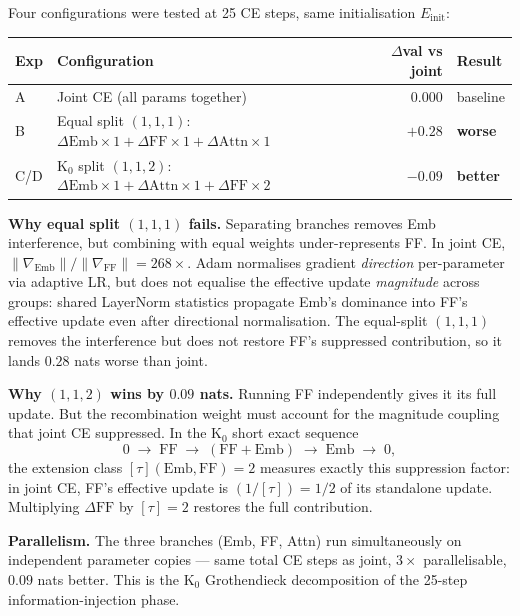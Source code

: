 \documentclass[11pt]{amsart}
\begin{document}
Four configurations were tested at 25 CE steps, same initialisation $E_\mathrm{init}$:

\begin{center}\small
\begin{tabular}{llrl}
\toprule
\textbf{Exp} & \textbf{Configuration} & \textbf{$\Delta$val vs joint} & \textbf{Result} \\
\midrule
A & Joint CE (all params together)        & $0.000$ & baseline \\
B & Equal split $(1,1,1)$: $\Delta\mathrm{Emb}{\times}1 + \Delta\mathrm{FF}{\times}1 + \Delta\mathrm{Attn}{\times}1$
  & $+0.28$ & \textbf{worse} \\
C/D & K$_0$ split $(1,1,2)$: $\Delta\mathrm{Emb}{\times}1 + \Delta\mathrm{Attn}{\times}1 + \Delta\mathrm{FF}{\times}2$
  & $-0.09$ & \textbf{better} \\
\bottomrule
\end{tabular}
\end{center}

\textbf{Why equal split $(1,1,1)$ fails.}
Separating branches removes Emb interference, but combining with equal
weights under-represents FF.
In joint CE, $\|\nabla_\mathrm{Emb}\| / \|\nabla_\mathrm{FF}\| = 268{\times}$.
Adam normalises gradient \emph{direction} per-parameter via adaptive LR,
but does not equalise the effective update \emph{magnitude} across groups:
shared LayerNorm statistics propagate Emb's dominance into FF's effective
update even after directional normalisation.
The equal-split $(1,1,1)$ removes the interference but does not restore FF's
suppressed contribution, so it lands $0.28$ nats worse than joint.

\textbf{Why $(1,1,2)$ wins by $0.09$ nats.}
Running FF independently gives it its full update.
But the recombination weight must account for the magnitude coupling
that joint CE suppressed.
In the K$_0$ short exact sequence
\[
  0 \;\to\; \mathrm{FF} \;\to\; (\mathrm{FF}+\mathrm{Emb}) \;\to\; \mathrm{Emb} \;\to\; 0,
\]
the extension class $[\tau](\mathrm{Emb},\mathrm{FF}) = 2$ measures
exactly this suppression factor:
in joint CE, FF's effective update is $(1/[\tau]) = 1/2$ of its standalone update.
Multiplying $\Delta\mathrm{FF}$ by $[\tau]=2$ restores the full contribution.

\textbf{Parallelism.}
The three branches (Emb, FF, Attn) run simultaneously on independent
parameter copies --- same total CE steps as joint, $3{\times}$ parallelisable,
$0.09$ nats better.
This is the K$_0$ Grothendieck decomposition of the 25-step
information-injection phase.
\end{document}
